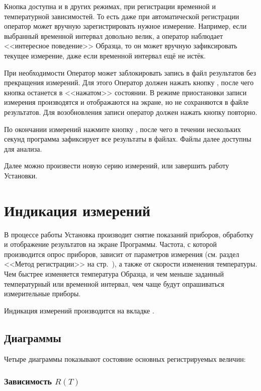 \documentclass[12pt, a4paper, twocolumn]{report}
\begin{document}
Кнопка  доступна и в других режимах, при регистрации временной и температурной зависимостей. То есть даже при автоматической регистрации оператор может вручную зарегистрировать нужное измерение. Например, если выбранный временной интервал довольно велик, а оператор наблюдает <<интересное поведение>> Образца, то он может вручную зафиксировать текущее измерение, даже если временной интервал ещё не истёк.

При необходимости Оператор может заблокировать запись в файл результатов без прекращения измерений. Для этого Оператор должен нажать кнопку , после чего кнопка останется в <<нажатом>> состоянии. В режиме приостановки записи измерения производятся и отображаются на экране, но не сохраняются в файле результатов. Для возобновления записи оператор должен нажать кнопку повторно.

По окончании измерений нажмите кнопку , после чего в течении нескольких секунд программа зафиксирует все результаты в файлах. Файлы далее доступны для анализа.

Далее можно произвести новую серию измерений, или завершить работу Установки.

\section{Индикация измерений}

В процессе работы Установка производит снятие показаний приборов, обработку и отображение результатов на экране Программы. Частота, с которой производится опрос приборов, зависит от параметров измерения (см. раздел <<Метод регистрации>> на стр.~\pageref{sec_reg_method}), а также от скорости изменения температуры. Чем быстрее изменяется температура Образца, и чем меньше заданный температурный или временной интервал, чем чаще будут опрашиваться измерительные приборы.

Индикация измерений производится на вкладке .

\subsection{Диаграммы}

Четыре диаграммы показывают состояние основных регистрируемых величин:

\subsubsection{Зависимость $R(T)$}
\end{document}
